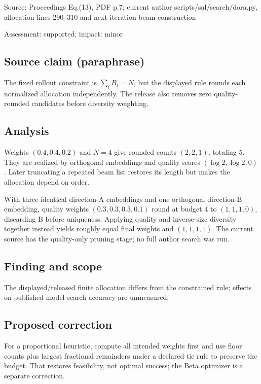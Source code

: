 \documentclass[11pt]{article}
\begin{document}
Source: Proceedings Eq.(13), PDF p.7; current author scripts/sal/search/dora.py, allocation lines 290–310 and next-iteration beam construction

Assessment: supported; impact: minor

\subsection*{Source claim (paraphrase)}

The fixed rollout constraint is \(\sum_iB_i=N\), but the displayed rule rounds each normalized allocation independently. The release also removes zero quality-rounded candidates before diversity weighting.

\subsection*{Analysis}

Weights \((0.4,0.4,0.2)\) and \(N=4\) give rounded counts \((2,2,1)\), totaling \(5\). They are realized by orthogonal embeddings and quality scores \((\log2,\log2,0)\). Later truncating a repeated beam list restores its length but makes the allocation depend on order.

With three identical direction-A embeddings and one orthogonal direction-B embedding, quality weights \((0.3,0.3,0.3,0.1)\) round at budget \(4\) to \((1,1,1,0)\), discarding B before uniqueness. Applying quality and inverse-size diversity together instead yields roughly equal final weights and \((1,1,1,1)\). The current source has the quality-only pruning stage; no full author search was run.

\subsection*{Finding and scope}

The displayed/released finite allocation differs from the constrained rule; effects on published model-search accuracy are unmeasured.

\subsection*{Proposed correction}

For a proportional heuristic, compute all intended weights first and use floor counts plus largest fractional remainders under a declared tie rule to preserve the budget. That restores feasibility, not optimal success; the Beta optimizer is a separate correction.
\end{document}
